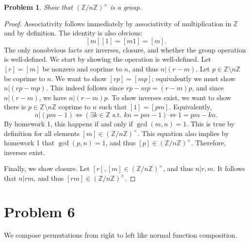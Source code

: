 \documentclass[11pt, letterpaper]{article}
\theoremstyle{plain}
\newtheorem{problem}{Problem}[section]
\begin{document}
\begin{problem}
	Show that $(\mathbb{Z} /n\mathbb{Z} )^\times $ is a group.
\end{problem}
\begin{proof}
	Associativity follows immediately by associativity of multiplication in $\mathbb{Z} $ and by definition. The identity is also obvious:
	\[
		[m][1]=[m1]=[m]
	.\]
	The only nonobvious facts are inverses, closure, and whether the group operation is well-defined. We start by showing the operation is well-defined. Let $[r]=[m]$ be nonzero and coprime to $n$, and thus $n|(r-m)$. Let $p\in\mathbb{Z} \setminus n\mathbb{Z} $ be coprime to $n$. We want to show $[rp]=[mp]$; equivalently we must show $n|(rp-mp)$. This indeed follows since $rp-mp=(r-m)p$, and since $n|(r-m)$, we have $n|(r-m)p$. To show inverses exist, we want to show there is $p\in\mathbb{Z} \setminus n\mathbb{Z} $ coprime to $n$ such that $[1]=[pm]$. Equivalently,
	\[
		n|(pm-1)\iff (\exists k\in\mathbb{Z} \text{ s.t. } kn=pm-1) \iff 1=pm-kn
	.\]
	By homework 1, this happens if and only if $\operatorname{gcd} (m,n)=1$. This is true by definition for all elements $[m]\in(\mathbb{Z} /n\mathbb{Z} )^{\times } $. This equation also implies by homework 1 that $\operatorname{gcd} (p,n)=1$, and thus $[p]\in(\mathbb{Z} /n\mathbb{Z} )^{\times } $. Therefore, inverses exist.

	Finally, we show closure. Let $[r],[m]\in(\mathbb{Z}/n\mathbb{Z} )^\times $, and thus $n|r,m$. It follows that $n|r m$, and thus $[r m]\in(\mathbb{Z} /n\mathbb{Z} )^\times $.
\end{proof}


\section{Problem 6}

\begin{convention}
	We compose permutations from right to left like normal function composition.
\end{convention}
\end{document}
